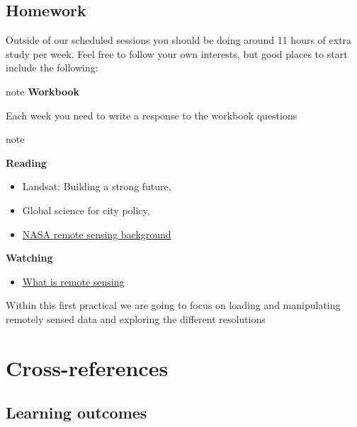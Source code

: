 \documentclass[
]{book}
\providecommand{\tightlist}{%
  \setlength{\itemsep}{0pt}\setlength{\parskip}{0pt}}
\begin{document}
\hypertarget{homework}{%
\section{Homework}\label{homework}}

Outside of our scheduled sessions you should be doing around 11 hours of extra study per week. Feel free to follow your own interests, but good places to start include the following:

\begin{infobox}{note}
\textbf{Workbook}

Each week you need to write a response to the workbook questions

\end{infobox}

\begin{infobox}{note}

\textbf{Reading}

\begin{itemize}
\tightlist
\item
  Landsat: Building a strong future, \textcite{lovelandLandsatBuildingStrong2012}
\item
  Global science for city policy, \textcite{MicheleAcuto2018}
\item
  \href{https://earthdata.nasa.gov/learn/backgrounders/remote-sensing}{NASA remote sensing background}
\end{itemize}

\textbf{Watching}

\begin{itemize}
\tightlist
\item
  \href{https://www.youtube.com/watch?v=N49PzLDUIFQ}{What is remote sensing}
\end{itemize}

\end{infobox}

Within this first practical we are going to focus on loading and manipulating remotely sensed data and exploring the different resolutions

\hypertarget{cross}{%
\chapter{Cross-references}\label{cross}}

\hypertarget{learning-outcomes-2}{%
\section{Learning outcomes}\label{learning-outcomes-2}}

\printbibliography
\end{document}
